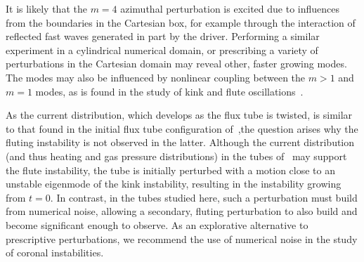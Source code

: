 \documentclass[fleqn,usenatbib]{mnras}
\newcommand{\rev}[1]{{\color{red} {#1}}}
\begin{document}
It is likely that the $m=4$ azimuthal perturbation is excited due to influences
from the boundaries in the Cartesian box, for example through the interaction
of reflected fast waves generated in part by the driver. Performing a similar
experiment in a cylindrical numerical domain, or prescribing a variety of
perturbations in the Cartesian domain may reveal other, faster growing modes.
The modes may also be influenced by nonlinear coupling between the $m>1$ and
$m=1$ modes, as is found in the study of kink and flute
oscillations~\citep{terradasEffectMagneticTwist2018,rudermanNonlinearGenerationFluting2017}. 

As the current distribution, which develops as the flux tube is twisted, is
similar to that found in the initial flux tube configuration
of~\cite{quinnEffectAnisotropicViscosity2020},the question arises why the
fluting instability is not observed in the latter. Although the current
distribution (and thus heating and \rev{gas} pressure distributions) in the tubes
of~\cite{quinnEffectAnisotropicViscosity2020} may support the flute
instability, the tube is initially perturbed with a motion close to an unstable
eigenmode of the kink instability, resulting in the instability growing from
$t=0$. In contrast, in the tubes studied here, such a perturbation must build
from numerical noise, allowing a secondary, fluting perturbation to also build
and become significant enough to observe. \rev{As an explorative alternative to
prescriptive perturbations, we recommend the use of numerical noise in the
study of coronal instabilities.}
\end{document}
